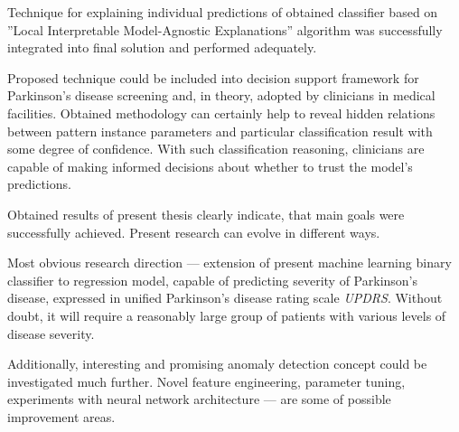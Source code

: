 
Technique for explaining individual predictions of obtained classifier based on ”Local Interpretable Model-Agnostic Explanations” algorithm was successfully integrated into final solution and performed adequately.

Proposed technique could be included into decision support framework for Parkinson's disease screening and, in theory, adopted by clinicians in medical facilities. Obtained methodology can certainly help to reveal hidden relations between pattern instance parameters and particular classification result with some degree of confidence. With such classification reasoning, clinicians are capable of making informed decisions about whether to trust the model’s predictions.

\vspace{0.5cm}

Obtained results of present thesis clearly indicate, that main goals were successfully achieved. Present research can evolve in different ways. 

\vspace{0.5cm}

Most obvious research direction --- extension of present machine learning binary classifier to regression model, capable of predicting severity of Parkinson's disease, expressed in unified Parkinson's disease rating scale \textit{UPDRS}. Without doubt, it will require a reasonably large group of patients with various  levels of disease severity. 

Additionally, interesting and promising anomaly detection concept could be investigated much further. Novel feature engineering, parameter tuning, experiments with neural network architecture --- are some of possible improvement areas.




